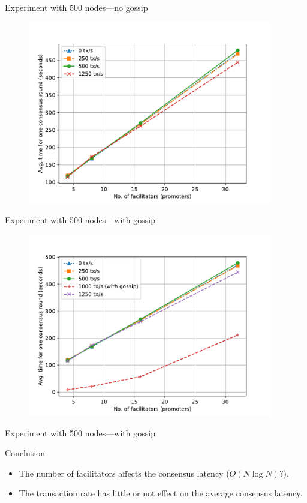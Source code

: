 \documentclass{beamer}
\begin{document}
\begin{frame}{Experiment with 500 nodes---no gossip}
  \begin{figure}[h]
  \includegraphics[width=0.95\textwidth]{figures/consensus-500-no-gossip}
  \centering
  \end{figure}
\end{frame}

\begin{frame}{Experiment with 500 nodes---with gossip}
  \begin{figure}[h]
  \includegraphics[width=0.95\textwidth]{figures/consensus-500}
  \centering
  \end{figure}
\end{frame}

\begin{frame}{Experiment with 500 nodes---with gossip}
  \begin{block}{Conclusion}
    \begin{itemize}
      \item The number of facilitators affects the consensus latency ($O(N\log{N})$?).
      \item The transaction rate has little or not effect on the average consensus latency.
    \end{itemize}
  \end{block}
\end{frame}
\end{document}
